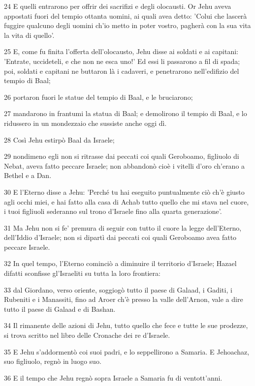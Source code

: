 \par 24 E quelli entrarono per offrir dei sacrifizi e degli olocausti. Or Jehu aveva appostati fuori del tempio ottanta uomini, ai quali avea detto: 'Colui che lascerà fuggire qualcuno degli uomini ch'io metto in poter vostro, pagherà con la sua vita la vita di quello'.
\par 25 E, come fu finita l'offerta dell'olocausto, Jehu disse ai soldati e ai capitani: 'Entrate, uccideteli, e che non ne esca uno!' Ed essi li passarono a fil di spada; poi, soldati e capitani ne buttaron là i cadaveri, e penetrarono nell'edifizio del tempio di Baal;
\par 26 portaron fuori le statue del tempio di Baal, e le bruciarono;
\par 27 mandarono in frantumi la statua di Baal; e demolirono il tempio di Baal, e lo ridussero in un mondezzaio che sussiste anche oggi dì.
\par 28 Così Jehu estirpò Baal da Israele;
\par 29 nondimeno egli non si ritrasse dai peccati coi quali Geroboamo, figliuolo di Nebat, aveva fatto peccare Israele; non abbandonò cioè i vitelli d'oro ch'erano a Bethel e a Dan.
\par 30 E l'Eterno disse a Jehu: 'Perché tu hai eseguito puntualmente ciò ch'è giusto agli occhi miei, e hai fatto alla casa di Achab tutto quello che mi stava nel cuore, i tuoi figliuoli sederanno sul trono d'Israele fino alla quarta generazione'.
\par 31 Ma Jehu non si fe' premura di seguir con tutto il cuore la legge dell'Eterno, dell'Iddio d'Israele; non si dipartì dai peccati coi quali Geroboamo avea fatto peccare Israele.
\par 32 In quel tempo, l'Eterno cominciò a diminuire il territorio d'Israele; Hazael difatti sconfisse gl'Israeliti su tutta la loro frontiera:
\par 33 dal Giordano, verso oriente, soggiogò tutto il paese di Galaad, i Gaditi, i Rubeniti e i Manassiti, fino ad Aroer ch'è presso la valle dell'Arnon, vale a dire tutto il paese di Galaad e di Bashan.
\par 34 Il rimanente delle azioni di Jehu, tutto quello che fece e tutte le sue prodezze, si trova scritto nel libro delle Cronache dei re d'Israele.
\par 35 E Jehu s'addormentò coi suoi padri, e lo seppellirono a Samaria. E Jehoachaz, suo figliuolo, regnò in luogo suo.
\par 36 E il tempo che Jehu regnò sopra Israele a Samaria fu di ventott'anni.

